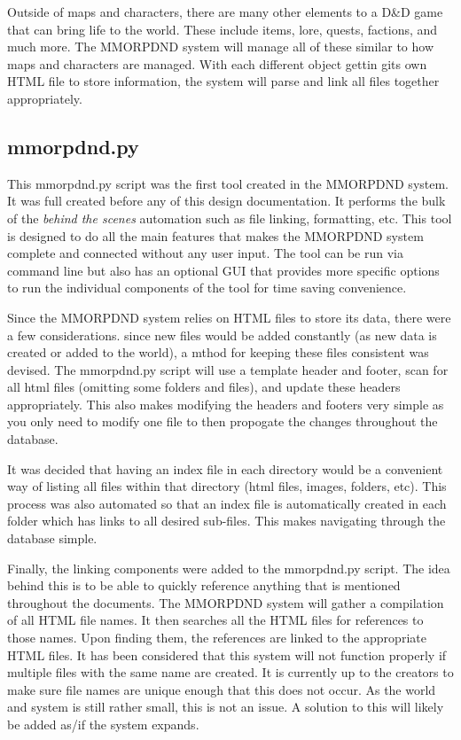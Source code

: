 Outside of maps and characters, there are many other elements to a D\&D game that can bring life to the world. These include items, lore, quests, factions, and much more. The MMORPDND system will manage all of these similar to how maps and characters are managed. With each different object gettin gits own HTML file to store information, the system will parse and link all files together appropriately.

\subsection{mmorpdnd.py}

This mmorpdnd.py script was the first tool created in the MMORPDND system. It was full created before any of this design documentation. It performs the bulk of the \textit{behind the scenes} automation such as file linking, formatting, etc. This tool is designed to do all the main features that makes the MMORPDND system complete and connected without any user input. The tool can be run via command line but also has an optional GUI that provides more specific options to run the individual components of the tool for time saving convenience.

Since the MMORPDND system relies on HTML files to store its data, there were a few considerations. since new files would be added constantly (as new data is created or added to the world), a mthod for keeping these files consistent was devised. The mmorpdnd.py script will use a template header and footer, scan for all html files (omitting some folders and files), and update these headers appropriately. This also makes modifying the headers and footers very simple as you only need to modify one file to then propogate the changes throughout the database.

It was decided that having an index file in each directory would be a convenient way of listing all files within that directory (html files, images, folders, etc). This process was also automated so that an index file is automatically created in each folder which has links to all desired sub-files. This makes navigating through the database simple.

Finally, the linking components were added to the mmorpdnd.py script. The idea behind this is to be able to quickly reference anything that is mentioned throughout the documents. The MMORPDND system will gather a compilation of all HTML file names. It then searches all the HTML files for references to those names. Upon finding them, the references are linked to the appropriate HTML files. It has been considered that this system will not function properly if multiple files with the same name are created. It is currently up to the creators to make sure file names are unique enough that this does not occur. As the world and system is still rather small, this is not an issue. A solution to this will likely be added as/if the system expands.

